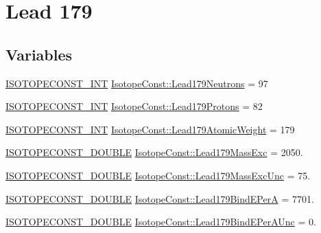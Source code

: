 \hypertarget{group___isotope_const-_lead-_pb179}{}\section{Lead 179}
\label{group___isotope_const-_lead-_pb179}
\subsection*{Variables}
\begin{DoxyCompactItemize}
\item 
\mbox{\hyperlink{group___isotope_const-_macros_ga5f18360b3e99483a35c32d789e62621c}{I\+S\+O\+T\+O\+P\+E\+C\+O\+N\+S\+T\+\_\+\+I\+NT}} \mbox{\hyperlink{group___isotope_const-_lead-_pb179_ga91c1d04faa31b80e23c2b053d9957419}{Isotope\+Const\+::\+Lead179\+Neutrons}} = 97
\item 
\mbox{\hyperlink{group___isotope_const-_macros_ga5f18360b3e99483a35c32d789e62621c}{I\+S\+O\+T\+O\+P\+E\+C\+O\+N\+S\+T\+\_\+\+I\+NT}} \mbox{\hyperlink{group___isotope_const-_lead-_pb179_ga6148a1a248d4d9da1fcdc11eea4f5654}{Isotope\+Const\+::\+Lead179\+Protons}} = 82
\item 
\mbox{\hyperlink{group___isotope_const-_macros_ga5f18360b3e99483a35c32d789e62621c}{I\+S\+O\+T\+O\+P\+E\+C\+O\+N\+S\+T\+\_\+\+I\+NT}} \mbox{\hyperlink{group___isotope_const-_lead-_pb179_ga4f81b4c1d332636ea05553b19a503086}{Isotope\+Const\+::\+Lead179\+Atomic\+Weight}} = 179
\item 
\mbox{\hyperlink{group___isotope_const-_macros_ga8f45a7272ce02c0b4c65c44636ed719a}{I\+S\+O\+T\+O\+P\+E\+C\+O\+N\+S\+T\+\_\+\+D\+O\+U\+B\+LE}} \mbox{\hyperlink{group___isotope_const-_lead-_pb179_ga50e0b2b88d438850aeab1e1831464735}{Isotope\+Const\+::\+Lead179\+Mass\+Exc}} = 2050.
\item 
\mbox{\hyperlink{group___isotope_const-_macros_ga8f45a7272ce02c0b4c65c44636ed719a}{I\+S\+O\+T\+O\+P\+E\+C\+O\+N\+S\+T\+\_\+\+D\+O\+U\+B\+LE}} \mbox{\hyperlink{group___isotope_const-_lead-_pb179_ga3f334c868c1c9ad51431062891b7e236}{Isotope\+Const\+::\+Lead179\+Mass\+Exc\+Unc}} = 75.
\item 
\mbox{\hyperlink{group___isotope_const-_macros_ga8f45a7272ce02c0b4c65c44636ed719a}{I\+S\+O\+T\+O\+P\+E\+C\+O\+N\+S\+T\+\_\+\+D\+O\+U\+B\+LE}} \mbox{\hyperlink{group___isotope_const-_lead-_pb179_ga4fbec604b3d1d8026578832482c9ffc2}{Isotope\+Const\+::\+Lead179\+Bind\+E\+PerA}} = 7701.
\item 
\mbox{\hyperlink{group___isotope_const-_macros_ga8f45a7272ce02c0b4c65c44636ed719a}{I\+S\+O\+T\+O\+P\+E\+C\+O\+N\+S\+T\+\_\+\+D\+O\+U\+B\+LE}} \mbox{\hyperlink{group___isotope_const-_lead-_pb179_ga5dd4b9c1c58ae7d189ecd9ee5c330c8a}{Isotope\+Const\+::\+Lead179\+Bind\+E\+Per\+A\+Unc}} = 0.

\end{DoxyCompactItemize}
